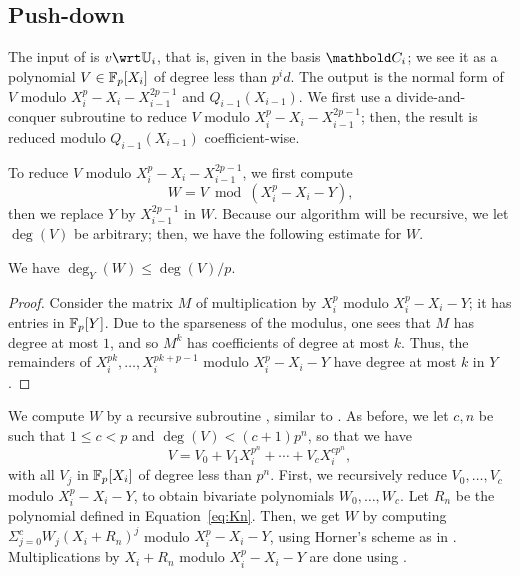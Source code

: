 
\subsection{Push-down}\label{sec:level-embedding:push-down}

The input of  is $v \wrt \U_i$, that is, given in the
basis $\basis{C}_i$; we see it as a polynomial $V \in \mathbb{F}_p[X_i]$ of degree
less than $p^id$. The output is the normal form of $V$ modulo
$X_i^p-X_i-X_{i-1}^{2p-1}$ and $Q_{i-1}(X_{i-1})$. We first use a
divide-and-conquer subroutine to reduce $V$ modulo
$X_i^p-X_i-X_{i-1}^{2p-1}$; then, the result is reduced modulo
$Q_{i-1}(X_{i-1})$ coefficient-wise.

To reduce $V$ modulo $X_i^p-X_i-X_{i-1}^{2p-1}$, we first compute 
\begin{equation}
  \label{eq:91}
  W=V \bmod (X_i^p-X_i-Y)
  \text{,} 
\end{equation}
then we replace $Y$ by $X_{i-1}^{2p-1}$ in $W$.  Because our algorithm
will be recursive, we let $\deg(V)$ be arbitrary; then, we have the
following estimate for $W$.

\begin{lemma}
  \label{th:push-down-degree} We have $\deg_Y(W)\le \deg(V)/p$.
\end{lemma}
\begin{proof}
  Consider the matrix $M$ of multiplication by $X_i^p$ modulo
  $X_i^p-X_i-Y$; it has entries in $\mathbb{F}_p[Y]$. Due to the sparseness of
  the modulus, one sees that $M$ has degree at most $1$, and so $M^k$
  has coefficients of degree at most $k$. Thus, the remainders of
  $X_i^{pk},\dots,X_i^{pk+p-1}$ modulo $X_i^p-X_i-Y$ have degree at
  most $k$ in $Y$.
\end{proof}


We compute $W$ by a recursive subroutine , similar
to . As before, we let $c,n$ be such that $1\le c<p$ and
$\deg(V) < (c+1)p^n$, so that we have
$$V=V_0+ V_1X_i^{p^n}+\cdots+V_c X_i^{cp^n},$$ with all $V_j$ in
$\mathbb{F}_p[X_i]$ of degree less than $p^n$. First, we recursively reduce
$V_0,\dots,V_c$ modulo $X_i^p-X_i-Y$, to obtain bivariate
polynomials $W_0,\dots,W_{c}$. Let $R_n$ be the polynomial defined in
Equation~\eqref{eq:Kn}. Then, we get $W$ by computing
$\Sigma_{j=0}^c W_j(X_i+R_n)^j$ modulo $X_i^p-X_i-Y$,
using Horner's scheme as in . Multiplications by
$X_i+R_n$ modulo $X_i^p-X_i-Y$ are done using .

